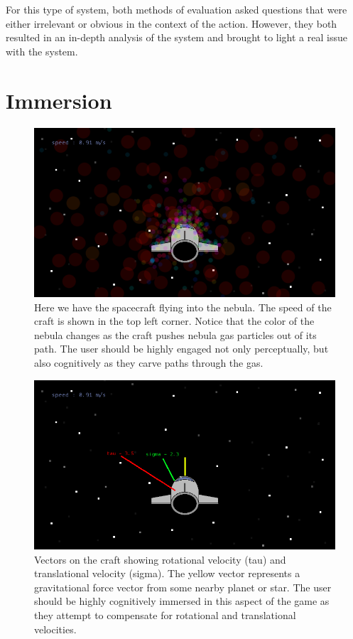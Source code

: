For this type of system, both methods of evaluation asked questions that were either irrelevant or obvious in the context of the action.  However, they both resulted in an in-depth analysis of the system and brought to light a real issue with the system.


\newpage

\section{Immersion}

\begin{figure}[H]
  \centering
  \includegraphics[scale=0.3]{../images/nebula.png}
  \caption{\footnotesize Here we have the spacecraft flying into the nebula.  The speed of the craft is shown in the top left corner.  Notice that the color of the nebula changes as the craft pushes nebula gas particles out of its path.  The user should be highly engaged not only perceptually, but also cognitively as they carve paths through the gas.}
\end{figure}

\begin{figure}[H]
  \centering
  \includegraphics[scale=0.3]{../images/vectors.png}
  \caption{\footnotesize Vectors on the craft showing rotational velocity (tau) and translational velocity (sigma).  The yellow vector represents a gravitational force vector from some nearby planet or star.  The user should be highly cognitively immersed in this aspect of the game as they attempt to compensate for rotational and translational velocities.}
\end{figure}


